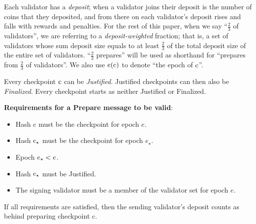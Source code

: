 \documentclass[12pt]{article}
\newcommand{\epoch}{\ensuremath{e}\xspace}
\newcommand{\hash}{\textnormal{c}\xspace}
\newcommand{\epochsource}{\ensuremath{\epoch_{\star}}\space}
\newcommand{\hashsource}{\ensuremath{\hash_{\star}}\xspace}
\newcommand{\signature}{\ensuremath{\mathcal{S}}\xspace}
\newcommand{\msgPREPARE}{\textbf{\textsc{prepare}}\xspace}
\newcommand{\msgCOMMIT}{\textbf{\textsc{commit}}\xspace}
\begin{document}
Each validator has a \emph{deposit}; when a validator joins their deposit is the number of coins that they deposited, and from there on each validator's deposit rises and falls with rewards and penalties. For the rest of this paper, when we say ``$\frac{2}{3}$ of validators'', we are referring to a \emph{deposit-weighted} fraction; that is, a set of validators whose sum deposit size equals to at least $\frac{2}{3}$ of the total deposit size of the entire set of validators. ``$\frac{2}{3}$ prepares'' will be used as shorthand for ``prepares from $\frac{2}{3}$ of validators''. We also use $\epoch(\hash)$ to denote ``the epoch of $\hash$''.

Every checkpoint $\hash$ can be \emph{Justified}.  Justified checkpoints can then also be \emph{Finalized}.  Every checkpoint starts as neither Justified or Finalized.




\textbf{Requirements for a Prepare message to be valid}:
\begin{itemize}
\item Hash \hash must be the checkpoint for epoch \epoch.
\item Hash \hashsource must be the checkpoint for epoch \epochsource.
\item Epoch $\epochsource < \epoch$.
\item Hash \hashsource must be Justified.
\item The signing validator must be a member of the validator set for epoch \epoch.
\end{itemize}
If all requirements are satisfied, then the sending validator's deposit counts as behind preparing checkpoint \hash.


\end{document}

